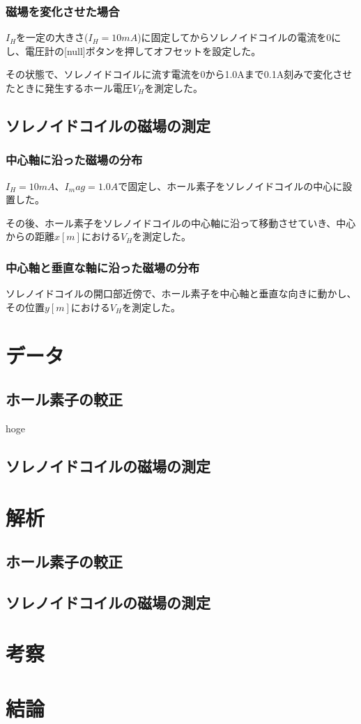 \documentclass[uplatex,11pt]{jsarticle}
\newcommand{\tab}[4]{ %
    \begin{table}[htb]
        \centering
        
        \caption{#3}
        \label{#1}
    \end{table}
}
\begin{document}
\subsubsection{磁場を変化させた場合}

$I_H$を一定の大きさ($I_H = 10mA$)に固定してからソレノイドコイルの電流を0にし、電圧計の[null]ボタンを押してオフセットを設定した。

その状態で、ソレノイドコイルに流す電流を0から1.0Aまで0.1A刻みで変化させたときに発生するホール電圧$V_H$を測定した。

\subsection{ソレノイドコイルの磁場の測定}

\subsubsection{中心軸に沿った磁場の分布}

$I_H = 10mA$、$I_mag = 1.0A$で固定し、ホール素子をソレノイドコイルの中心に設置した。

その後、ホール素子をソレノイドコイルの中心軸に沿って移動させていき、中心からの距離$x[m]$における$V_H$を測定した。

\subsubsection{中心軸と垂直な軸に沿った磁場の分布}

ソレノイドコイルの開口部近傍で、ホール素子を中心軸と垂直な向きに動かし、その位置$y[m]$における$V_H$を測定した。

\section{データ}
\subsection{ホール素子の較正}

\tab{b_1}{./csv/jikken_b_1.csv}{hoge}{3}

\subsection{ソレノイドコイルの磁場の測定}

\section{解析}
\subsection{ホール素子の較正}

\subsection{ソレノイドコイルの磁場の測定}

\section{考察}
\section{結論}
\end{document}
